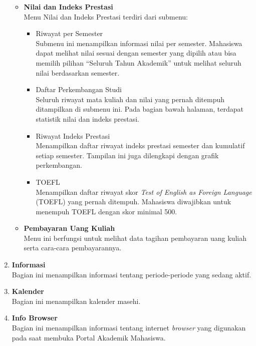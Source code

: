 \begin{enumerate}
\begin{itemize}
		\item \textbf{Nilai dan Indeks Prestasi}\\
		Menu Nilai dan Indeks Prestasi terdiri dari submenu: 
		\begin{itemize}
			\item Riwayat per Semester \\
			Submenu ini menampilkan informasi nilai per semester. Mahasiswa dapat melihat nilai sesuai dengan semester yang dipilih atau bisa memilih
pilihan ``Seluruh Tahun Akademik'' untuk melihat seluruh nilai berdasarkan semester.
			\item Daftar Perkembangan Studi \\
			Seluruh riwayat mata kuliah dan nilai yang pernah ditempuh ditampilkan di submenu ini. Pada bagian bawah halaman, terdapat statistik nilai dan indeks prestasi. 
			\item Riwayat Indeks Prestasi \\
			Menampilkan daftar riwayat indeks prestasi semester dan kumulatif setiap semester. Tampilan ini juga dilengkapi dengan grafik perkembangan. 
			\item TOEFL \\
			Menampilkan daftar riwayat skor \textit{Test of English as Foreign Language} (TOEFL) yang pernah ditempuh. Mahasiswa diwajibkan untuk menempuh TOEFL dengan skor minimal 500.
		\end{itemize}
		
		\item \textbf{Pembayaran Uang Kuliah}\\
		Menu ini berfungsi untuk melihat data tagihan pembayaran uang kuliah serta cara-cara pembayarannya.
		\end{itemize}
		
	\item \textbf{Informasi}\\
		Bagian ini menampilkan informasi tentang periode-periode yang sedang aktif.
		
	\item \textbf{Kalender}\\
		Bagian ini menampilkan kalender masehi.
		
	\item \textbf{Info Browser}\\
		Bagian ini menampilkan informasi tentang internet \textit{browser} yang digunakan pada saat membuka Portal Akademik Mahasiswa. 
\end{enumerate}

